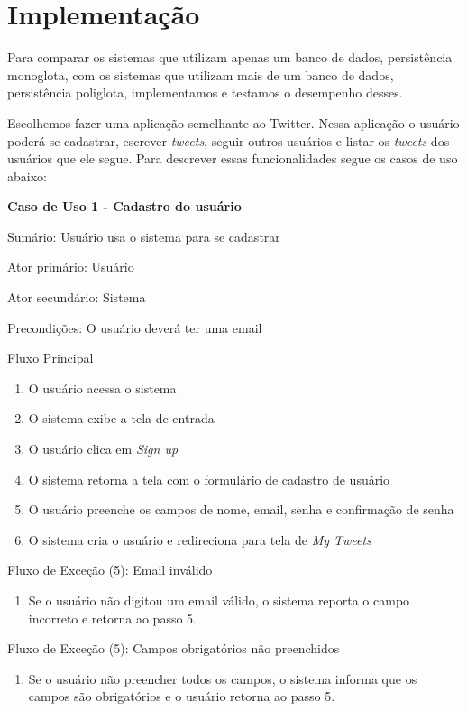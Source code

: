 \section{Implementação}
\label{sec:implementation}
Para comparar os sistemas que utilizam apenas um banco de dados, persistência monoglota, com os sistemas que utilizam mais de um banco de dados, persistência poliglota, implementamos e testamos o desempenho desses.

Escolhemos fazer uma aplicação semelhante ao Twitter. Nessa aplicação o usuário poderá se cadastrar, escrever \textit{tweets}, seguir outros usuários e listar os \textit{tweets} dos usuários que ele segue. Para descrever essas funcionalidades segue os casos de uso abaixo:

\textbf{Caso de Uso 1 - Cadastro do usuário}

Sumário: Usuário usa o sistema para se cadastrar

Ator primário: Usuário

Ator secundário: Sistema

Precondições: O usuário deverá ter uma email

Fluxo Principal

\begin{enumerate}
\item O usuário acessa o sistema
\item O sistema exibe a tela de entrada
\item O usuário clica em \textit{Sign up}
\item O sistema retorna a tela com o formulário de cadastro de usuário
\item O usuário preenche os campos de nome, email, senha e confirmação de senha
\item O sistema cria o usuário e redireciona para tela de \textit{My Tweets}
\end{enumerate}

Fluxo de Exceção (5): Email inválido
\begin{enumerate}
\item Se o usuário não digitou um email válido, o sistema reporta o campo incorreto e retorna ao passo 5.
\end{enumerate}

Fluxo de Exceção (5): Campos obrigatórios não preenchidos
\begin{enumerate}
\item Se o usuário não preencher todos os campos, o sistema informa que os campos são obrigatórios e o usuário retorna ao passo 5.
\end{enumerate}

